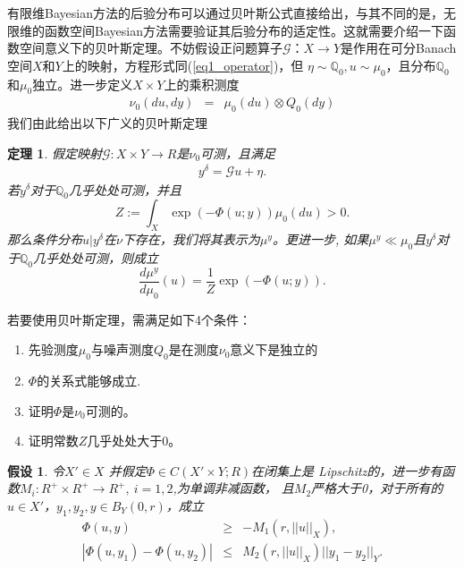 \documentclass[a4paper,12pt,oneside,CJK]{cctbook}
\newtheorem{thm}  {\indent 定理}[section]
\newtheorem{assum}{\indent 假设}[section]
\theoremstyle{definition}
\numberwithin{equation}{section}
\begin{document}
有限维Bayesian方法的后验分布可以通过贝叶斯公式直接给出，与其不同的是，无限维的函数空间Bayesian方法需要验证其后验分布的适定性。这就需要介绍一下函数空间意义下的贝叶斯定理。不妨假设正问题算子$\mathcal{G}：X\rightarrow Y$是作用在可分Banach空间$X$和$Y$上的映射，方程形式同(\ref{eq1_operator})，但
$\eta\sim \mathbb{Q}_0,u \sim \mu_0$，且分布$\mathbb{Q}_0$和$\mu_0$独立。进一步定义$X\times Y$上的乘积测度
\begin{eqnarray*}
    \nu_0(du,dy)&=&\mu_0(du)  \otimes Q_0(dy)
\end{eqnarray*}
我们由此给出以下广义的贝叶斯定理
\begin{thm}\label{thm_bayesian}
假定映射$\mathcal{G}: X \times Y \rightarrow R$是$\nu_0$可测，且满足
\begin{align*}
y^{\delta} = \mathcal{G}u + \eta.
\end{align*}
若$y^{\delta}$对于$\mathbb{Q}_0$几乎处处可测，并且
$$Z:=\int_X \exp(-\Phi(u;y))\mu_0 (du)>0.$$
那么条件分布$u|y^{\delta}$在$\nu$下存在，我们将其表示为$\mu^y$。更进一步, 如果$\mu^y \ll \mu_0$且$y^{\delta}$对于$\mathbb{Q}_0$几乎处处可测，则成立
$$\frac{d\mu^y}{d\mu_0}(u)=\frac{1}{Z}\exp\left(-\Phi(u;y)\right).$$
\end{thm}















若要使用贝叶斯定理，需满足如下4个条件：
\begin{enumerate}
\item 先验测度$\mu_0$与噪声测度$Q_0$是在测度$\nu_0$意义下是独立的
\item $\Phi$的关系式能够成立.
\item 证明$\Phi$是$\nu_0$可测的。
\item 证明常数$Z$几乎处处大于0。
\end{enumerate}

\begin{assum}\label{ass1}
 令$X'\in X$ 并假定$\Phi\in C(X'\times Y;R)$在闭集上是
Lipschitz的，进一步有函数$M_i:R^+\times R^+\rightarrow R^+,~i=1,2$,为单调非减函数，
且$M_2$严格大于0，对于所有的$u\in X'$，$y_1,y_2,y\in B_Y(0,r)$，成立
\begin{eqnarray*}
   \Phi(u,y)&\geq& -M_1(r,||u||_X),\\
   |\Phi(u,y_1)-\Phi(u,y_2)|&\leq& M_2(r,||u||_X)||y_1-y_2||_Y.
\end{eqnarray*}
\end{assum}
\end{document}
